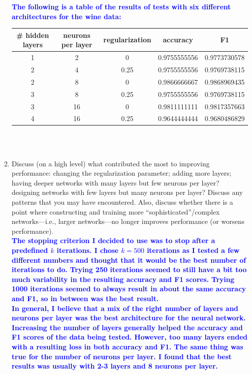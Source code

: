 \documentclass[letterpaper]{article}
\newcommand{\HIGHLIGHT}[1]{\textcolor{blue}{\textbf{#1}}}
\begin{document}
\begin{enumerate}
\HIGHLIGHT{The following is a table of the results of tests with six different architectures for the wine data:}

\begin{tabular}{|c|c|c|c|c|}
\hline
\# hidden layers & neurons per layer & regularization & accuracy & F1 \\
\hline
1 & 2 & 0 & 0.9755555556 & 0.9773730578 \\
\hline
2 & 4 & 0.25 & 0.9755555556 & 0.9769738115 \\
\hline
2 & 8 & 0 & 0.9866666667 & 0.9868969435 \\
\hline
3 & 8 & 0.25 & 0.9755555556 & 0.9769738115 \\
\hline
3 & 16 & 0 & 0.9811111111 & 0.9817357663 \\
\hline
4 & 16 & 0.25 & 0.9644444444 & 0.9680486829 \\
\hline
\end{tabular} \\ \\
    
    
    
    \item Discuss (on a high level) what contributed the most to improving performance: changing the regularization parameter; adding more layers; having deeper networks with many layers but few neurons per layer? designing networks with few layers but many neurons per layer? Discuss any patterns that you may have encountered. Also, discuss whether there is a point where constructing and training more ``sophisticated''/complex networks---i.e., larger networks---no longer improves performance (or worsens performance). \\
    
\HIGHLIGHT{The stopping criterion I decided to use was to stop after a predefined $k$ iterations. I chose $k=500$ iterations as I tested a few different numbers and thought that it would be the best number of iterations to do. Trying 250 iterations seemed to still have a bit too much variability in the resulting accuracy and F1 scores. Trying 1000 iterations seemed to always result in about the same accuracy and F1, so in between was the best result.} \\

\HIGHLIGHT{In general, I believe that a mix of the right number of layers and neurons per layer was the best architecture for the neural network. Increasing the number of layers generally helped the accuracy and F1 scores of the data being tested. However, too many layers ended with a resulting loss in both accuracy and F1. The same thing was true for the number of neurons per layer. I found that the best results was usually with 2-3 layers and 8 neurons per layer.} \\


\end{enumerate}
\end{document}

